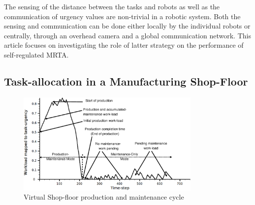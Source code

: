 \documentclass[smallcondensed]{svjour3}
\begin{document}
The sensing of the distance between the tasks and robots as well as the communication of urgency values are non-trivial in a robotic system.  Both the sensing and communication can be done either locally by the individual robots or centrally, through an overhead camera and a global communication network.
This article focuses on investigating the role of latter strategy on the performance of self-regulated MRTA.
\subsection{Task-allocation in a Manufacturing Shop-Floor}
\label{sec:mrta}
\begin{figure}[htp]
\centering
\includegraphics[width=0.8\textwidth, angle=0]
{./images/VSP.eps}
\caption{\small Virtual Shop-floor production and maintenance cycle}
\label{fig:vsp}  %
\end{figure}
\end{document}
